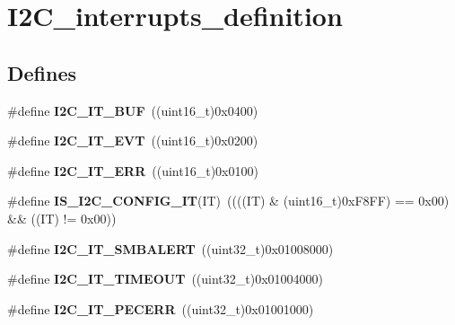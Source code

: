 \hypertarget{group__I2C__interrupts__definition}{
\section{I2C\_\-interrupts\_\-definition}
\label{group__I2C__interrupts__definition}
}
\subsection*{Defines}
\begin{DoxyCompactItemize}
\item 
\hypertarget{group__I2C__interrupts__definition_gad3ff3f405b882aa4d2f91310aa1cc0df}{
\#define {\bfseries I2C\_\-IT\_\-BUF}~((uint16\_\-t)0x0400)}
\label{group__I2C__interrupts__definition_gad3ff3f405b882aa4d2f91310aa1cc0df}

\item 
\hypertarget{group__I2C__interrupts__definition_gadd59efa313e1598a084a1e5ec3905b02}{
\#define {\bfseries I2C\_\-IT\_\-EVT}~((uint16\_\-t)0x0200)}
\label{group__I2C__interrupts__definition_gadd59efa313e1598a084a1e5ec3905b02}

\item 
\hypertarget{group__I2C__interrupts__definition_gadba3667b439cbf4ba1e6e9aec961ab03}{
\#define {\bfseries I2C\_\-IT\_\-ERR}~((uint16\_\-t)0x0100)}
\label{group__I2C__interrupts__definition_gadba3667b439cbf4ba1e6e9aec961ab03}

\item 
\hypertarget{group__I2C__interrupts__definition_gae2695a081871336881f9105d6c847c4f}{
\#define {\bfseries IS\_\-I2C\_\-CONFIG\_\-IT}(IT)~((((IT) \& (uint16\_\-t)0xF8FF) == 0x00) \&\& ((IT) != 0x00))}
\label{group__I2C__interrupts__definition_gae2695a081871336881f9105d6c847c4f}

\item 
\hypertarget{group__I2C__interrupts__definition_gab6049d4dd856a085127752e01ebb8120}{
\#define {\bfseries I2C\_\-IT\_\-SMBALERT}~((uint32\_\-t)0x01008000)}
\label{group__I2C__interrupts__definition_gab6049d4dd856a085127752e01ebb8120}

\item 
\hypertarget{group__I2C__interrupts__definition_ga45ce34b163b456a5fb3833f1264d93b4}{
\#define {\bfseries I2C\_\-IT\_\-TIMEOUT}~((uint32\_\-t)0x01004000)}
\label{group__I2C__interrupts__definition_ga45ce34b163b456a5fb3833f1264d93b4}

\item 
\hypertarget{group__I2C__interrupts__definition_ga23069e7787c4f052f34887c02bc44100}{
\#define {\bfseries I2C\_\-IT\_\-PECERR}~((uint32\_\-t)0x01001000)}
\label{group__I2C__interrupts__definition_ga23069e7787c4f052f34887c02bc44100}


\end{DoxyCompactItemize}
